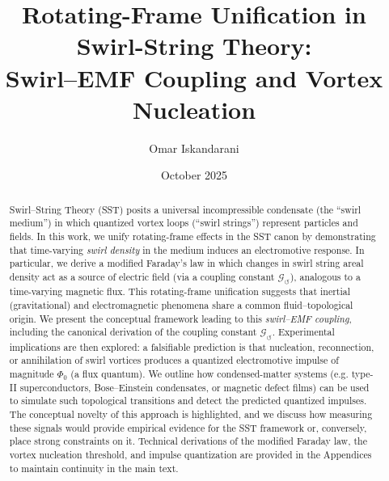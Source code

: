 \documentclass[12pt]{article}
\begin{document}
\title{Rotating-Frame Unification in Swirl-String Theory:\\Swirl--EMF Coupling and Vortex Nucleation}
\author{Omar Iskandarani}
\date{October 2025}
\maketitle

\begin{abstract}
\noindent Swirl--String Theory (SST) posits a universal incompressible condensate (the ``swirl medium'') in which quantized vortex loops (``swirl strings'') represent particles and fields. In this work, we unify rotating-frame effects in the SST canon by demonstrating that time-varying \emph{swirl density} in the medium induces an electromotive response. In particular, we derive a modified Faraday's law in which changes in swirl string areal density act as a source of electric field (via a coupling constant $\mathcal{G}_{\!\boldsymbol{\circlearrowleft}}$), analogous to a time-varying magnetic flux. This rotating-frame unification suggests that inertial (gravitational) and electromagnetic phenomena share a common fluid–topological origin. We present the conceptual framework leading to this \emph{swirl--EMF coupling}, including the canonical derivation of the coupling constant $\mathcal{G}_{\!\boldsymbol{\circlearrowleft}}$. Experimental implications are then explored: a falsifiable prediction is that nucleation, reconnection, or annihilation of swirl vortices produces a quantized electromotive impulse of magnitude $\Phi_{0}$ (a flux quantum). We outline how condensed-matter systems (e.g. type-II superconductors, Bose–Einstein condensates, or magnetic defect films) can be used to simulate such topological transitions and detect the predicted quantized impulses. The conceptual novelty of this approach is highlighted, and we discuss how measuring these signals would provide empirical evidence for the SST framework or, conversely, place strong constraints on it. Technical derivations of the modified Faraday law, the vortex nucleation threshold, and impulse quantization are provided in the Appendices to maintain continuity in the main text.
\end{abstract}
\end{document}
